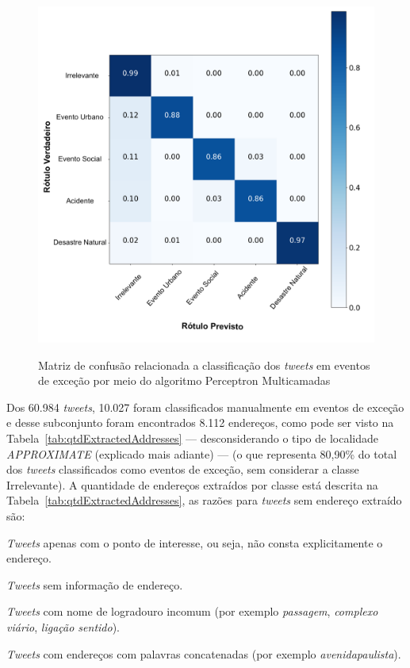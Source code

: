 \documentclass[
	12pt,				%
	oneside,			%
	a4paper,			%
	english,			%
	brazil				%
	]{abntex2ppgsi}
\begin{document}
{{{\begin{figure}[!htb]
	\centering
 	  \caption{Matriz de confusão relacionada a classificação dos \textit{tweets} em eventos de exceção por meio do algoritmo Perceptron Multicamadas}
		\includegraphics[width=1\linewidth]{images/confusion_matrix_mlp_pt.png}
	\label{fig:confusion_matrix_mlp}
\end{figure}

Dos 60.984 \textit{tweets}, 10.027 foram classificados manualmente em eventos de exceção e desse subconjunto foram encontrados 8.112 endereços, como pode ser visto na Tabela~\ref{tab:qtdExtractedAddresses} --- desconsiderando o tipo de localidade \textit{APPROXIMATE} (explicado mais adiante) --- (o que representa 80,90\% do total dos \textit{tweets} classificados como eventos de exceção, sem considerar a classe Irrelevante). A quantidade de endereços extraídos por classe está descrita na Tabela~\ref{tab:qtdExtractedAddresses}, as razões para \textit {tweets} sem endereço extraído são:

\begin{enumerate*}
\item \textit{Tweets} apenas com o ponto de interesse, ou seja, não consta explicitamente o endereço.
\item \textit{Tweets} sem informação de endereço.
\item \textit{Tweets} com nome de logradouro incomum (por exemplo \emph{passagem}, \emph{complexo viário}, \emph{ligação sentido}).
\item \textit{Tweets} com endereços com palavras concatenadas (por exemplo \emph{avenidapaulista}).
\end{enumerate*}

}}}
\end{document}
